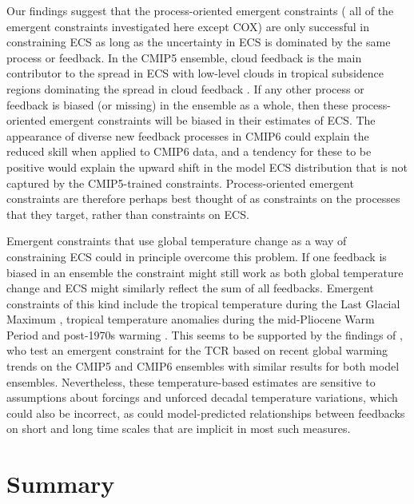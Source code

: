 Our findings suggest that the process-oriented emergent constraints (\ie{} all
of the emergent constraints investigated here except COX) are only successful
in constraining \ac{ECS} as long as the uncertainty in \ac{ECS} is dominated by
the same process or feedback. In the \acs{CMIP}5 ensemble, cloud feedback is
the main contributor to the spread in \ac{ECS} with low-level clouds in
tropical subsidence regions dominating the spread in cloud feedback
\autocite{Ceppi2017}. If any other process or feedback is biased (or missing)
in the ensemble as a whole, then these process-oriented emergent constraints
will be biased in their estimates of \ac{ECS}. The appearance of diverse new
feedback processes in \acs{CMIP}6 could explain the reduced skill when applied
to \acs{CMIP}6 data, and a tendency for these to be positive would explain the
upward shift in the model \ac{ECS} distribution that is not captured by the
\acs{CMIP}5-trained constraints. Process-oriented emergent constraints are
therefore perhaps best thought of as constraints on the processes that they
target, rather than constraints on \ac{ECS}.

Emergent constraints that use global temperature change as a way of
constraining \ac{ECS} could in principle overcome this problem. If one feedback
is biased in an ensemble the constraint might still work as both global
temperature change and \ac{ECS} might similarly reflect the sum of all
feedbacks. Emergent constraints of this kind include the tropical temperature
during the Last Glacial Maximum \autocite{Hargreaves2012}, tropical temperature
anomalies during the mid-Pliocene Warm Period \autocite{Hargreaves2016} and
post-1970s warming \autocite{JimenezdelaCuesta2019}. This seems to be supported
by the findings of \textcite{Tokarska2020}, who test an emergent constraint for
the \ac{TCR} based on recent global warming trends on the \acs{CMIP}5 and
\acs{CMIP}6 ensembles with similar results for both model ensembles.
Nevertheless, these temperature-based estimates are sensitive to assumptions
about forcings and unforced decadal temperature variations, which could also be
incorrect, as could model-predicted relationships between feedbacks on short
and long time scales that are implicit in most such measures.


\section{Summary}
\label{sec:05:summary}

